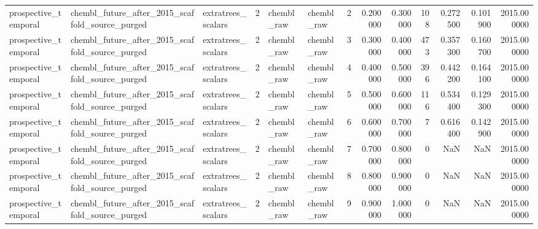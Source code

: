 \begin{longtable}{lllrllrrrrrrr}
prospective\_temporal & chembl\_future\_after\_2015\_scaffold\_source\_purged & extratrees\_scalars & 2 & chembl\_raw & chembl\_raw & 2 & 0.200000 & 0.300000 & 108 & 0.272500 & 0.101900 & 2015.000000 \\
prospective\_temporal & chembl\_future\_after\_2015\_scaffold\_source\_purged & extratrees\_scalars & 2 & chembl\_raw & chembl\_raw & 3 & 0.300000 & 0.400000 & 473 & 0.357300 & 0.160700 & 2015.000000 \\
prospective\_temporal & chembl\_future\_after\_2015\_scaffold\_source\_purged & extratrees\_scalars & 2 & chembl\_raw & chembl\_raw & 4 & 0.400000 & 0.500000 & 396 & 0.442200 & 0.164100 & 2015.000000 \\
prospective\_temporal & chembl\_future\_after\_2015\_scaffold\_source\_purged & extratrees\_scalars & 2 & chembl\_raw & chembl\_raw & 5 & 0.500000 & 0.600000 & 116 & 0.534400 & 0.129300 & 2015.000000 \\
prospective\_temporal & chembl\_future\_after\_2015\_scaffold\_source\_purged & extratrees\_scalars & 2 & chembl\_raw & chembl\_raw & 6 & 0.600000 & 0.700000 & 7 & 0.616400 & 0.142900 & 2015.000000 \\
prospective\_temporal & chembl\_future\_after\_2015\_scaffold\_source\_purged & extratrees\_scalars & 2 & chembl\_raw & chembl\_raw & 7 & 0.700000 & 0.800000 & 0 & NaN & NaN & 2015.000000 \\
prospective\_temporal & chembl\_future\_after\_2015\_scaffold\_source\_purged & extratrees\_scalars & 2 & chembl\_raw & chembl\_raw & 8 & 0.800000 & 0.900000 & 0 & NaN & NaN & 2015.000000 \\
prospective\_temporal & chembl\_future\_after\_2015\_scaffold\_source\_purged & extratrees\_scalars & 2 & chembl\_raw & chembl\_raw & 9 & 0.900000 & 1.000000 & 0 & NaN & NaN & 2015.000000 \\
\end{longtable}
